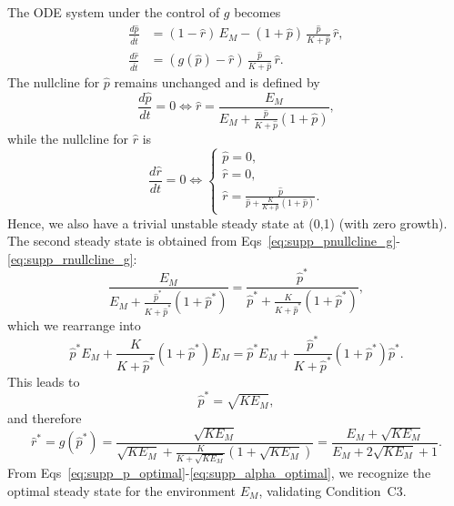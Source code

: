The ODE system under the control of $g$ becomes
\begin{equation}
\label{eq:supp_adim_g}
\begin{aligned}
\frac{d\hat{p}}{d\hat{t}} &= (1-\hat{r})\, E_M - (1 + \hat{p}) \, \frac{\hat{p}}{K + \hat{p}}\, \hat{r},\\
\frac{d\hat{r}}{d\hat{t}} &= \left(g(\hat{p}) - \hat{r} \right) \, \frac{\hat{p}}{K + \hat{p}}\, \hat{r}.
\end{aligned}
\end{equation}
The nullcline for $\hat{p}$ remains unchanged and is defined by
\begin{equation}
\label{eq:supp_pnullcline_g}
\frac{d\hat{p}}{dt} = 0 \Leftrightarrow 
\hat{r} = \frac{E_M}{E_M + \frac{\hat{p}}{K+\hat{p}} (1+\hat{p})},
\end{equation}
while the nullcline for $\hat{r}$ is
\begin{equation}
\label{eq:supp_rnullcline_g}
\frac{d\hat{r}}{dt} = 0 \Leftrightarrow \begin{cases}
\hat{p} = 0,\\
\hat{r} = 0,\\
\hat{r} = \frac{\hat{p}}{\hat{p} + \frac{K}{K+\hat{p}} (1+\hat{p})}.
\end{cases}
\end{equation}
Hence, we also have a trivial unstable steady state at (0,1) (with zero growth).
The second steady state is obtained from Eqs~\ref{eq:supp_pnullcline_g}-\ref{eq:supp_rnullcline_g}:
\begin{equation*}
\frac{E_M}{E_M + \frac{\hat{p}^*}{K+\hat{p}^*} (1+\hat{p}^*)} = \frac{\hat{p}^*}{\hat{p}^* + \frac{K}{K+\hat{p}^*} (1+\hat{p}^*)},
\end{equation*}
which we rearrange into
\begin{equation*}
\hat{p}^* E_M + \frac{K}{K+\hat{p}^*} (1+\hat{p}^*) E_M = \hat{p}^* E_M + \frac{\hat{p}^*}{K+\hat{p}^*} (1+\hat{p}^*) \hat{p}^*.
\end{equation*}
This leads to
\begin{equation*}
\hat{p}^* = \sqrt{K E_M},
\end{equation*}
and therefore
\begin{equation*}
\hat{r}^* = g(\hat{p}^*) = \frac{\sqrt{K E_M}}{\sqrt{K E_M} + \frac{K}{K + \sqrt{K E_M}} (1+\sqrt{K E_M})} = \frac{E_M + \sqrt{K E_M}}{E_M + 2\sqrt{K E_M} + 1}.
\end{equation*}
From Eqs~\ref{eq:supp_p_optimal}-\ref{eq:supp_alpha_optimal}, we recognize the optimal steady state for the environment $E_M$, validating Condition~C3.
